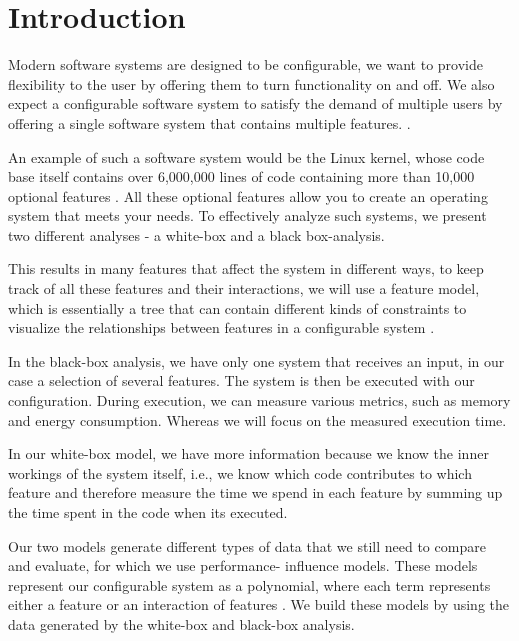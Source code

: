\chapter{Introduction}\label{ch:introduction}

Modern software systems are designed to be configurable, we want to provide flexibility to the user by offering them to turn functionality on 
and off. 
We also expect a configurable software system to satisfy the demand of multiple users by offering a single software system that 
contains multiple features. \cite{Feature-Oriented-Software-Product-Lines}. 

An example of such a software system would be the Linux kernel, whose code base itself contains over 6,000,000 lines of code containing more 
than 10,000 optional features \cite{Linux-Kernel}. 
All these optional features allow you to create an operating system that meets your needs. To effectively analyze such systems,
we present two different analyses - a white-box and a black box-analysis.

This results in many features that affect the system in different ways, to keep track of all these features and their interactions,
we will use a feature model, which is essentially a tree that can contain different kinds of constraints to visualize the relationships 
between features in a configurable system \cite{KangFeatureOrientedDomain1990}.

In the black-box analysis, we have only one system that receives an input, in our case a selection of several features.
The system is then be executed with our configuration. During execution, we can measure various metrics, such as memory and energy
consumption. Whereas we will focus on the measured execution time.

In our white-box model, we have more information because we know the inner workings of the
system itself, i.e., we know which code contributes to which feature and therefore measure the time we spend in each feature by summing
up the time spent in the code when its executed.

Our two models generate different types of data that we still need to compare and evaluate, for which we use performance-
influence models. These models represent our configurable system as a polynomial, where each term represents either a feature or an 
interaction of features \cite{Performance-influence-models-for-highly-configurable-systems}. We build these models by using the data generated 
by the white-box and black-box analysis.

